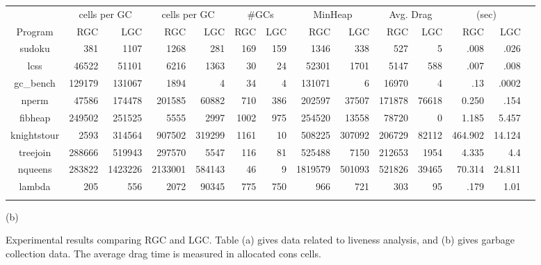 \documentclass[9pt]{sigplanconf}
\begin{document}
\begin{figure}[t]
{\begin{tabular}{| c | r | r | r | r | r | r  |  r | r |
r | r | r | r | r |}
                            &   \multicolumn{2}{c|}{cells per GC}
                            &   \multicolumn{2}{c|}{cells per GC}
                            &   \multicolumn{2}{c|}{\#GCs}
                            &   \multicolumn{2}{c|}{MinHeap}
                            &   \multicolumn{2}{c|}{Avg. Drag}
                            &   \multicolumn{2}{c|}{(sec)} \\
\cline{2-13}
{Program}    &
RGC & LGC & RGC & LGC  & RGC & LGC  &   RGC & LGC & RGC & LGC & RGC &
LGC \\
\hline
\hline
    {\sf   sudoku}  &381 &1107 &1268 &281 &169 &159 & 1346  &338 &527 &5
&.008 & .026 \\
    {\sf  lcss } & 46522 &51101 &6216 &1363&30&24& 52301  &1701 &5147
&588 &.007 & .008 \\
    {\sf   gc\_bench}  &129179 &131067 &1894 &4&34&4& 131071   &6 &16970
 &4 &.13 & .0002 \\
     {\sf  nperm}  & 47586  &174478 &201585 &60882&710&386& 202597  &37507
&171878 &76618 &0.250 & .154  \\
    {\sf  fibheap} &249502  &251525 &5555 &2997&1002&975& 254520  &13558
&78720 &0 &1.185 & 5.457  \\
    {\sf  knightstour}  &2593 &314564 &907502 &319299&1161&10&508225
&307092 &206729 &82112 &464.902 & 14.124  \\
    {\sf  treejoin} & 288666  &519943 &297570 &5547&116&81& 525488  &7150
&212653 &1954 &4.335 & 4.4 \\
    {\sf   nqueens} & 283822 &1423226 &2133001 &584143&46&9& 1819579
&501093 &521826 &39465 &70.314 & 24.811 \\
    {\sf   lambda}  &205 & 556 &2072&90345 &775 &750&966 & 721  &303 &95
&.179 &1.01  \\
\\
 \hline
\end{tabular}}



\centerline{(b)}
\vskip -0.75mm
\caption{Experimental results comparing RGC and LGC. Table (a) gives
  data related to liveness analysis, and (b) gives garbage collection
  data. The average drag time is measured in allocated cons cells.}
\label{fig:experimental-results}
\normalsize
\end{figure}
\end{document}
